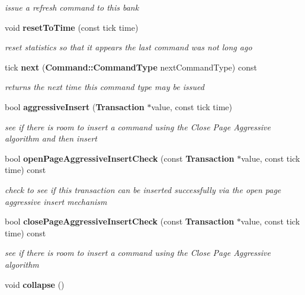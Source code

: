 \begin{DoxyCompactItemize}
\begin{DoxyCompactList}\small\item\em issue a refresh command to this bank \item\end{DoxyCompactList}\item 
void {\bf resetToTime} (const tick time)
\begin{DoxyCompactList}\small\item\em reset statistics so that it appears the last command was not long ago \item\end{DoxyCompactList}\item 
tick {\bf next} ({\bf Command::CommandType} nextCommandType) const \label{class_d_r_a_msim_i_i_1_1_bank_aa896a275af07a53299ce3b5c2c33fea1}

\begin{DoxyCompactList}\small\item\em returns the next time this command type may be issued \item\end{DoxyCompactList}\item 
bool {\bf aggressiveInsert} ({\bf Transaction} $\ast$value, const tick time)
\begin{DoxyCompactList}\small\item\em see if there is room to insert a command using the Close Page Aggressive algorithm and then insert \item\end{DoxyCompactList}\item 
bool {\bf openPageAggressiveInsertCheck} (const {\bf Transaction} $\ast$value, const tick time) const 
\begin{DoxyCompactList}\small\item\em check to see if this transaction can be inserted successfully via the open page aggressive insert mechanism \item\end{DoxyCompactList}\item 
bool {\bf closePageAggressiveInsertCheck} (const {\bf Transaction} $\ast$value, const tick time) const 
\begin{DoxyCompactList}\small\item\em see if there is room to insert a command using the Close Page Aggressive algorithm \item\end{DoxyCompactList}\item 
void {\bf collapse} ()\label{class_d_r_a_msim_i_i_1_1_bank_ac3aa018b8b63cbc809190eadee5990cd}


\end{DoxyCompactItemize}
